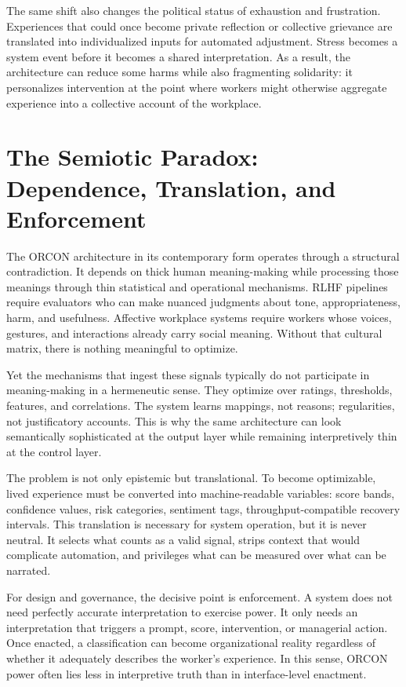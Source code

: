 \documentclass[runningheads]{llncs}
\begin{document}
The same shift also changes the political status of exhaustion and frustration. Experiences that could once become private reflection or collective grievance are translated into individualized inputs for automated adjustment. Stress becomes a system event before it becomes a shared interpretation. As a result, the architecture can reduce some harms while also fragmenting solidarity: it personalizes intervention at the point where workers might otherwise aggregate experience into a collective account of the workplace.

\section{The Semiotic Paradox: Dependence, Translation, and Enforcement}

The ORCON architecture in its contemporary form operates through a structural contradiction. It depends on thick human meaning-making while processing those meanings through thin statistical and operational mechanisms. RLHF pipelines require evaluators who can make nuanced judgments about tone, appropriateness, harm, and usefulness. Affective workplace systems require workers whose voices, gestures, and interactions already carry social meaning. Without that cultural matrix, there is nothing meaningful to optimize.

Yet the mechanisms that ingest these signals typically do not participate in meaning-making in a hermeneutic sense. They optimize over ratings, thresholds, features, and correlations. The system learns mappings, not reasons; regularities, not justificatory accounts. This is why the same architecture can look semantically sophisticated at the output layer while remaining interpretively thin at the control layer.

The problem is not only epistemic but translational. To become optimizable, lived experience must be converted into machine-readable variables: score bands, confidence values, risk categories, sentiment tags, throughput-compatible recovery intervals. This translation is necessary for system operation, but it is never neutral. It selects what counts as a valid signal, strips context that would complicate automation, and privileges what can be measured over what can be narrated.

For design and governance, the decisive point is enforcement. A system does not need perfectly accurate interpretation to exercise power. It only needs an interpretation that triggers a prompt, score, intervention, or managerial action. Once enacted, a classification can become organizational reality regardless of whether it adequately describes the worker's experience. In this sense, ORCON power often lies less in interpretive truth than in interface-level enactment.
\end{document}
